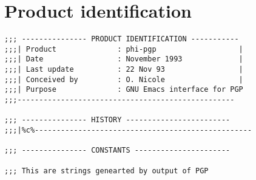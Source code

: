 \section{Product identification}
\begin{verbatim}
;;; --------------- PRODUCT IDENTIFICATION -----------
;;;| Product              : phi-pgp                   |
;;;| Date                 : November 1993             |
;;;| Last update          : 22 Nov 93                 |
;;;| Conceived by         : O. Nicole                 |
;;;| Purpose              : GNU Emacs interface for PGP
;;;--------------------------------------------------

;;; --------------- HISTORY ------------------------
;;;|%c%--------------------------------------------------

;;; --------------- CONSTANTS ----------------------

;;; This are strings genearted by output of PGP


\end{verbatim}
